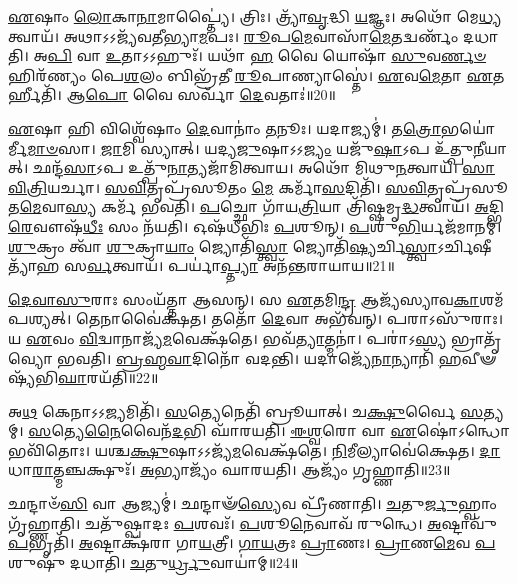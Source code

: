\-\ul{𑌏}\-𑌷𑌾𑌂 \ul{𑌲𑍋}\-𑌕𑌾\-\ul{𑌨𑌾}\-𑌮𑌾𑌪𑍍𑌤𑍍𑌯𑍈॑।
𑌤𑍍𑌰𑌿𑌃।
𑌤𑍍𑌰𑍍𑌯𑌾᳴\-\ul{𑌵𑍃}\-𑌦𑍍𑌧𑌿 \ul{𑌯}\-𑌜𑍍𑌞𑌃।
𑌅𑌥𑍋᳴ 𑌮𑍇\-\ul{𑌧𑍍𑌯}\-𑌤𑍍𑌵𑌾𑌯᳴।
𑌅𑌥𑌾𑌽𑌽𑌜𑍍𑌯᳴𑌵𑌤𑍀𑌭𑍍𑌯𑌾\-\ul{𑌮}\-𑌪𑌃।
\-\ul{𑌰𑍂}\-𑌪\-\ul{𑌮𑍇}\-𑌵𑌾𑌸𑌾᳴\-\ul{𑌮𑍇}\-𑌤𑌦𑍍𑌵𑌰𑍍𑌣𑌂᳴ 𑌦𑌧𑌾𑌤𑌿।
𑌅\-\ul{𑌪𑌿} 𑌵𑌾 \ul{𑌉}\-𑌤𑌾𑌽𑌽𑌹𑍁𑌃᳴।
𑌯𑌥𑌾᳴ \ul{𑌹} 𑌵𑍈 𑌯𑍋𑌷𑌾᳴ \ul{𑌸𑍁}\-𑌵\-\ul{𑌰𑍍𑌣}\-\-\ul{𑍞} 𑌹𑌿𑌰᳴𑌣𑍍𑌯𑌂 𑌪𑍇\-\ul{𑌶}\-𑌲𑌂 𑌬𑌿𑌭𑍍𑌰᳴𑌤𑍀 \ul{𑌰𑍂}\-𑌪𑌾𑌣𑍍𑌯𑌾𑌸𑍍𑌤𑍇॑।
\-\ul{𑌏}\-𑌵\-\ul{𑌮𑍇}\-𑌤𑌾 \ul{𑌏}\-𑌤𑌰𑍍\mbox{}𑌹𑍀𑌤𑌿᳴।
𑌆\-\ul{𑌪𑍋} 𑌵𑍈 𑌸𑌰𑍍𑌵𑌾᳴ \ul{𑌦𑍇}\-𑌵𑌤𑌾𑌃॑॥20॥

\-\ul{𑌏}\-𑌷𑌾 𑌹𑌿 𑌵𑌿𑌶𑍍𑌵𑍇᳴𑌷𑌾𑌂 \ul{𑌦𑍇}\-𑌵𑌾𑌨𑌾𑌂॑ \ul{𑌤}\-𑌨𑍂𑌃।
𑌯𑌦𑌾𑌜𑍍𑌯𑌮𑍍॑।
𑌤\-\ul{𑌤𑍍𑌰𑍋}\-𑌭𑌯𑍋॑𑌰𑍍𑌮𑍀\-\ul{𑌮𑌾}\-\-\ul{𑍞}\-𑌸𑌾।
\-\ul{𑌜𑌾}\-𑌮𑌿 𑌸𑍍𑌯𑌾𑌤𑍍।
𑌯𑌦𑍍𑌯\-\ul{𑌜𑍁}\-𑌷𑌾\-𑌽𑌽\-\ul{𑌜𑍍𑌯𑌂} 𑌯𑌜𑍁᳴\-\ul{𑌷𑌾}\-𑌽𑌪 𑌉᳴𑌤𑍍𑌪𑍁\-\ul{𑌨𑍀}\-𑌯𑌾𑌤𑍍।
𑌛𑌨𑍍𑌦᳴\-\ul{𑌸𑌾}\-𑌽𑌪 𑌉𑌤𑍍𑌪𑍁᳴\-\ul{𑌨𑌾}\-𑌤𑍍𑌯𑌜𑌾᳴𑌮𑌿𑌤𑍍𑌵𑌾𑌯।
𑌅𑌥𑍋᳴ 𑌮𑌿𑌥𑍁\-\ul{𑌨}\-𑌤𑍍𑌵𑌾𑌯᳴।
\-\ul{𑌸𑌾}\-\-\ul{𑌵𑌿}\-\-\ul{𑌤𑍍𑌰𑌿}\-𑌯𑌰𑍍𑌚𑌾।
\-\ul{𑌸}\-\-\ul{𑌵𑌿}\-𑌤𑍃𑌪𑍍𑌰᳴𑌸𑍂𑌤𑌂 \ul{𑌮𑍇} 𑌕𑌰𑍍𑌮𑌾᳴\-\ul{𑌸}\-𑌦𑌿𑌤𑌿᳴।
\-\ul{𑌸}\-\-\ul{𑌵𑌿}\-𑌤𑍃𑌪𑍍𑌰᳴𑌸𑍂𑌤\-\ul{𑌮𑍇}\-𑌵𑌾\-\ul{𑌸𑍍𑌯} 𑌕𑌰𑍍𑌮᳴ 𑌭𑌵𑌤𑌿।
\-\ul{𑌪}\-𑌚𑍍𑌛𑍋 𑌗𑌾᳴𑌯\-\ul{𑌤𑍍𑌰𑌿}\-𑌯𑌾 𑌤𑍍𑌰𑌿᳴𑌷𑍍𑌷𑌮𑍃\-\ul{𑌦𑍍𑌧}\-𑌤𑍍𑌵𑌾𑌯᳴।
\-\ul{𑌅}\-𑌦𑍍𑌭𑌿\-\ul{𑌰𑍇}\-𑌵𑍗𑌷᳴\-\ul{𑌧𑍀𑌃} 𑌸𑌂 𑌨᳴𑌯𑌤𑌿।
𑌓𑌷᳴𑌧𑍀𑌭𑌿𑌃 \ul{𑌪}\-𑌶𑍂𑌨𑍍।
\-\ul{𑌪}\-𑌶𑍁\-\ul{𑌭𑌿}\-𑌰𑍍𑌯𑌜᳴𑌮𑌾𑌨𑌮𑍍।
\-\ul{𑌶𑍁}\-𑌕𑍍𑌰𑌂 𑌤𑍍𑌵𑌾᳴ \ul{𑌶𑍁}\-𑌕𑍍𑌰𑌾\-\ul{𑌯𑌾𑌂} 𑌜𑍍𑌯𑍋𑌤𑌿᳴\-\ul{𑌸𑍍𑌤𑍍𑌵𑌾} 𑌜𑍍𑌯𑍋𑌤𑌿᳴\-\ul{𑌷𑍍𑌯}\-𑌰𑍍𑌚𑌿\-\ul{𑌸𑍍𑌤𑍍𑌵𑌾}\-\-𑌽𑌰𑍍𑌚𑌿𑌷𑍀𑌤𑍍𑌯𑌾᳴𑌹 𑌸\-\ul{𑌰𑍍𑌵}\-𑌤𑍍𑌵𑌾𑌯᳴।
𑌪𑌰𑍍𑌯𑌾॑\-\ul{𑌪𑍍𑌤𑍍𑌯𑌾} 𑌅𑌨᳴𑌨𑍍𑌤𑌰𑌾𑌯𑌾𑌯॥21॥\anuvakamend[\-\ul{𑌈}\-\-\ul{𑌕𑍍𑌷}\-\-\ul{𑌤} \ul{𑌆}\-\-\ul{𑌹} \ul{𑌶𑌾}\-\-\ul{𑌸𑍍𑌤𑍇} \ul{𑌲𑍋}\-𑌕𑌾 \ul{𑌦𑍇}\-𑌵𑌤𑌾᳴ 𑌭𑌵\-\ul{𑌤𑌿} 𑌷𑌟𑍍 𑌚᳴]

\-\ul{𑌦𑍇}\-\-\ul{𑌵𑌾}\-\-\ul{𑌸𑍁}\-𑌰𑌾𑌃 𑌸𑌂𑌯᳴𑌤𑍍𑌤𑌾 𑌆𑌸𑌨𑍍।
𑌸 \ul{𑌏}\-𑌤𑌮𑌿\-\ul{𑌨𑍍𑌦𑍍𑌰} 𑌆𑌜𑍍𑌯᳴𑌸𑍍𑌯𑌾𑌵\-\-\ul{𑌕𑌾}\-𑌶𑌮᳴\-𑌪𑌶𑍍𑌯𑌤𑍍।
𑌤𑍇𑌨𑌾𑌵𑍈॑𑌕𑍍𑌷𑌤।
𑌤𑌤𑍋᳴ \ul{𑌦𑍇}\-𑌵𑌾 𑌅𑌭᳴𑌵𑌨𑍍।
𑌪𑌰𑌾𑌽𑌸𑍁᳴𑌰𑌾𑌃।
𑌯 \ul{𑌏}\-𑌵𑌂 \ul{𑌵𑌿}\-𑌦𑍍𑌵𑌾𑌨𑌾𑌜𑍍𑌯᳴\-\ul{𑌮}\-𑌵𑍇𑌕𑍍𑌷᳴𑌤𑍇।
𑌭𑌵᳴\-\ul{𑌤𑍍𑌯𑌾}\-𑌤𑍍𑌮𑌨𑌾॑।
𑌪𑌰𑌾॑𑌽\-\ul{𑌸𑍍𑌯} 𑌭𑍍𑌰𑌾𑌤𑍃᳴𑌵𑍍𑌯𑍋 𑌭𑌵𑌤𑌿।
\-\ul{𑌬𑍍𑌰}\-\-\ul{𑌹𑍍𑌮}\-\-\ul{𑌵𑌾}\-𑌦𑌿𑌨𑍋᳴ 𑌵𑌦𑌨𑍍𑌤𑌿।
𑌯𑌦𑌾𑌜𑍍𑌯𑍇᳴\-\ul{𑌨𑌾}\-𑌨𑍍𑌯𑌾𑌨𑌿᳴ \ul{𑌹}\-𑌵𑍀𑍟𑌷𑍍𑌯᳴𑌭𑌿\-\ul{𑌘𑌾}\-𑌰𑌯᳴𑌤𑌿॥22॥

𑌅\-\ul{𑌥} 𑌕𑍇𑌨𑌾𑌽𑌽\-\ul{𑌜𑍍𑌯}\-𑌮𑌿𑌤𑌿᳴।
\-\ul{𑌸}\-𑌤𑍍𑌯𑍇𑌨𑍇𑌤𑌿᳴ 𑌬𑍍𑌰𑍂𑌯𑌾𑌤𑍍।
𑌚\-\ul{𑌕𑍍𑌷𑍁}\-𑌰𑍍𑌵𑍈 \ul{𑌸}\-𑌤𑍍𑌯𑌮𑍍।
\-\ul{𑌸}\-𑌤𑍍𑌯𑍇\-\ul{𑌨𑍈}\-𑌵𑍈𑌨᳴\-\ul{𑌦}\-𑌭𑌿 𑌘𑌾᳴𑌰𑌯𑌤𑌿।
\-\ul{𑌈}\-\-\ul{𑌶𑍍𑌵}\-𑌰𑍋 𑌵𑌾 \ul{𑌏}\-𑌷𑍋॑\-𑌽𑌨𑍍𑌧𑍋 𑌭𑌵𑌿᳴𑌤𑍋𑌃।
𑌯𑌶𑍍𑌚\-\ul{𑌕𑍍𑌷𑍁}\-𑌷𑌾\-𑌽𑌽𑌜𑍍𑌯᳴\-\ul{𑌮}\-𑌵𑍇𑌕𑍍𑌷᳴𑌤𑍇।
\-\ul{𑌨𑌿}\-𑌮𑍀𑌲𑍍𑌯𑌾𑌵𑍇॑𑌕𑍍𑌷𑍇𑌤।
\-\ul{𑌦𑌾}\-𑌧𑌾\-\ul{𑌰𑌾}\-𑌤𑍍𑌮𑌞𑍍𑌚𑌕𑍍𑌷𑍁𑌃᳴।
\-\ul{𑌅}\-𑌭𑍍𑌯𑌾𑌜𑍍𑌯𑌂᳴ 𑌘𑌾𑌰𑌯𑌤𑌿।
𑌆𑌜𑍍𑌯𑌂᳴ 𑌗𑍃𑌹𑍍𑌣𑌾𑌤𑌿॥23॥

𑌛𑌨𑍍𑌦𑌾𑍞᳴\-\ul{𑌸𑌿} 𑌵𑌾 𑌆𑌜𑍍𑌯𑌮𑍍॑।
𑌛𑌨𑍍𑌦𑌾𑍟᳴\-\ul{𑌸𑍍𑌯𑍇}\-𑌵 𑌪𑍍𑌰𑍀᳴𑌣𑌾𑌤𑌿।
\-\ul{𑌚}\-𑌤𑍁\-\ul{𑌰𑍍𑌜𑍁}\-𑌹𑍍𑌵𑌾𑌂 𑌗𑍃᳴𑌹𑍍𑌣𑌾𑌤𑌿।
𑌚𑌤𑍁᳴𑌷𑍍𑌪𑌾𑌦𑌃 \ul{𑌪}\-𑌶𑌵𑌃᳴।
\-\ul{𑌪}\-𑌶𑍂\-\ul{𑌨𑍇}\-𑌵𑌾𑌵᳴ 𑌰𑍁𑌨𑍍𑌧𑍇।
\-\ul{𑌅}\-𑌷𑍍𑌟𑌾𑌵𑍁᳴\-\ul{𑌪}\-𑌭𑍃𑌤𑌿᳴।
\-\ul{𑌅}\-𑌷𑍍𑌟𑌾𑌕𑍍𑌷᳴𑌰𑌾 𑌗𑌾\-\ul{𑌯}\-𑌤𑍍𑌰𑍀।
\-\ul{𑌗𑌾}\-\-\ul{𑌯}\-𑌤𑍍𑌰𑌃 \ul{𑌪𑍍𑌰𑌾}\-𑌣𑌃।
\-\ul{𑌪𑍍𑌰𑌾}\-𑌣\-\ul{𑌮𑍇}\-𑌵 \ul{𑌪}\-𑌶𑍁𑌷𑍁᳴ 𑌦𑌧𑌾𑌤𑌿।
\-\ul{𑌚}\-𑌤𑍁\-\ul{𑌰𑍍𑌧𑍍𑌰𑍁}\-𑌵𑌾𑌯𑌾॑𑌮𑍍॥24॥


